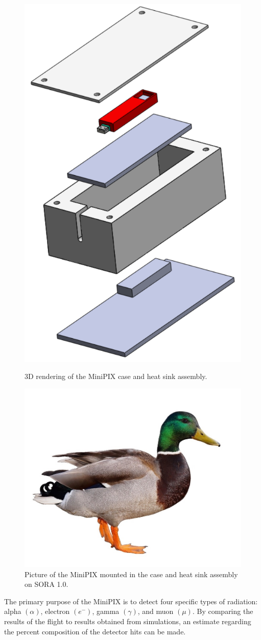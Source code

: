 \begin{figure}[h]
  \begin{minipage}[c]{0.49\linewidth}
    \includegraphics[scale=1, width=.5\textwidth]{Figures/MinipixCaseAssembly.pdf}
    \caption{3D rendering of the MiniPIX case and heat sink assembly.}
    \label{fig:CaseAssembly}
  \end{minipage}
  \hfill
  \begin{minipage}[c]{0.49\linewidth}
    \centering
    \includegraphics[scale=1, width=.5\textwidth]{Figures/duck.jpg}
    \caption{Picture of the MiniPIX mounted in the case and heat sink assembly on SORA 1.0.}
    \label{fig:CaseAssembly2}
  \end{minipage}
\end{figure}

The primary purpose of the MiniPIX is to detect four specific types of radiation: alpha $(\alpha)$, electron $({e^-})$, gamma $({\gamma})$, and muon $({\mu})$. By comparing the results of the flight to results obtained from simulations, an estimate regarding the percent composition of the detector hits can be made.

